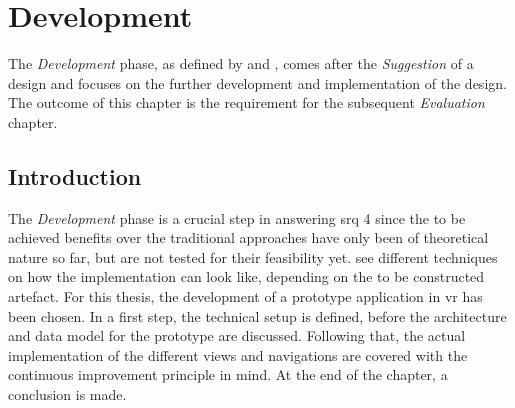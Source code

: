 
\chapter{Development}

\label{ChapterDevelopment}



The \textit{Development} phase, as defined by \cite{Vaishnavi2008} and \cite{Hevner2010}, comes after the \textit{Suggestion} of a design and focuses on the further development and implementation of the design. The outcome of this chapter is the requirement for the subsequent \textit{Evaluation} chapter. 


\section{Introduction}

The \textit{Development} phase is a crucial step in answering \gls{srq} 4 since the to be achieved benefits over the traditional approaches have only been of theoretical nature so far, but are not tested for their feasibility yet. \cite{Vaishnavi2008} see different techniques on how the implementation can look like, depending on the to be constructed artefact. For this thesis, the development of a prototype application in \gls{vr} has been chosen. In a first step, the technical setup is defined, before the architecture and data model for the prototype are discussed. Following that, the actual implementation of the different views and navigations are covered with the continuous improvement principle in mind. At the end of the chapter, a conclusion is made.


